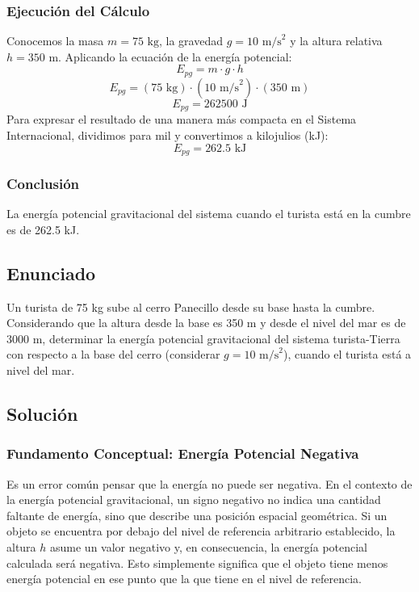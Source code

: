 \documentclass[12pt,a4paper]{article}
\begin{document}
\subsubsection*{Ejecución del Cálculo}
Conocemos la masa $m = 75 \text{ kg}$, la gravedad $g = 10 \text{ m/s}^2$ y la altura relativa $h = 350 \text{ m}$. Aplicando la ecuación de la energía potencial:
$$E_{pg} = m \cdot g \cdot h$$
$$E_{pg} = (75 \text{ kg}) \cdot (10 \text{ m/s}^2) \cdot (350 \text{ m})$$
$$E_{pg} = 262500 \text{ J}$$
Para expresar el resultado de una manera más compacta en el Sistema Internacional, dividimos para mil y convertimos a kilojulios (kJ):
$$E_{pg} = 262.5 \text{ kJ}$$

\subsubsection*{Conclusión}
La energía potencial gravitacional del sistema cuando el turista está en la cumbre es de 262.5 kJ.

\newpage
\subsection*{Enunciado}
Un turista de 75 kg sube al cerro Panecillo desde su base hasta la cumbre. Considerando que la altura desde la base es 350 m y desde el nivel del mar es de 3000 m, determinar la energía potencial gravitacional del sistema turista-Tierra con respecto a la base del cerro (considerar $g = 10 \text{ m/s}^2$), cuando el turista está a nivel del mar.

\subsection*{Solución}

\subsubsection*{Fundamento Conceptual: Energía Potencial Negativa}
Es un error común pensar que la energía no puede ser negativa. En el contexto de la energía potencial gravitacional, un signo negativo no indica una cantidad faltante de energía, sino que describe una posición espacial geométrica. Si un objeto se encuentra por debajo del nivel de referencia arbitrario establecido, la altura $h$ asume un valor negativo y, en consecuencia, la energía potencial calculada será negativa. Esto simplemente significa que el objeto tiene menos energía potencial en ese punto que la que tiene en el nivel de referencia.
\end{document}
